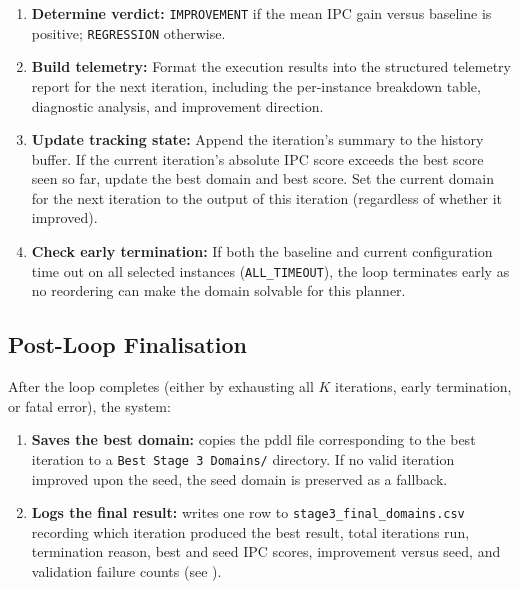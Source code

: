 \begin{enumerate}
  \item \textbf{Determine verdict:}
        \texttt{IMPROVEMENT} if the mean IPC gain versus baseline is positive; \texttt{REGRESSION} otherwise.

  \item \textbf{Build telemetry:}
        Format the execution results into the structured telemetry report for the next iteration, including the per-instance breakdown table, diagnostic analysis, and improvement direction.

  \item \textbf{Update tracking state:}
        Append the iteration's summary to the history buffer.
        If the current iteration's absolute IPC score exceeds the best score seen so far, update the best domain and best score.
        Set the current domain for the next iteration to the output of this iteration (regardless of whether it improved).

  \item \textbf{Check early termination:}
        If both the baseline and current configuration time out on all selected instances (\texttt{ALL\_TIMEOUT}), the loop terminates early as no reordering can make the domain solvable for this planner.
\end{enumerate}

\subsection{Post-Loop Finalisation}
\label{sec:design:stage3:finalisation}

After the loop completes (either by exhausting all $K$ iterations, early termination, or fatal error), the system:

\begin{enumerate}
  \item \textbf{Saves the best domain:} copies the \gls{pddl} file corresponding to the best iteration to a \texttt{Best Stage~3 Domains/} directory.
        If no valid iteration improved upon the seed, the seed domain is preserved as a fallback.
  \item \textbf{Logs the final result:} writes one row to \texttt{stage3\_final\_domains.csv} recording which iteration produced the best result, total iterations run, termination reason, best and seed IPC scores, improvement versus seed, and validation failure counts (see ).
\end{enumerate}

